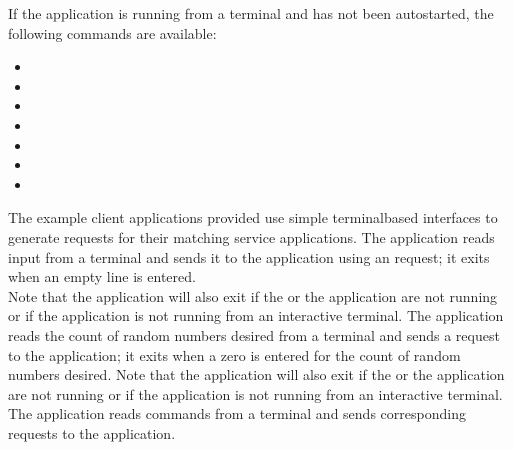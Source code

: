 If the application is running from a terminal and has not been autostarted, the following
commands are available:
\begin{itemize}
\item{}
\item\exSp{}
\item\exSp{}
\item\exSp{}
\item\exSp{}
\item\exSp{}
\item\exSp{}
\end{itemize}
\secondaryEnd{}
The example client applications provided use simple terminal\longDash{}based interfaces to
generate requests for their matching service applications.
The  application reads input from a terminal and
sends it to the  application using an
 request; it exits when an empty line is
entered.\\

Note that the application will also exit if the
 or the
 application are not running or if the application
is not running from an interactive terminal.
The  application reads the count of
random numbers desired from a terminal and sends a
 request to the
 application; it exits when a zero is
entered for the count of random numbers desired.
Note that the application will also exit if the
 or the
 application are not running or if the
application is not running from an interactive terminal.
The  application reads commands from a
terminal and sends corresponding requests to the
 application.\\

